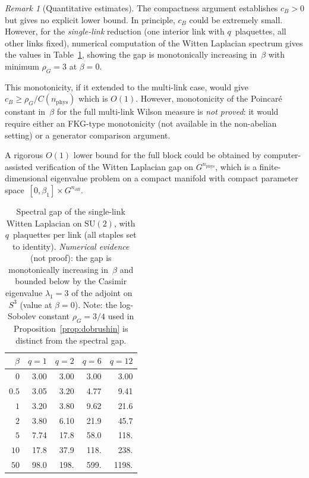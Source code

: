 \documentclass[11pt,a4paper]{article}
\theoremstyle{plain}
\theoremstyle{definition}
\theoremstyle{remark}
\newtheorem{remark}[theorem]{Remark}
\newcommand{\SU}{\mathrm{SU}}
\begin{document}
\begin{remark}[Quantitative estimates]
\label{rem:quantitative}
The compactness argument establishes $c_B > 0$ but gives
no explicit lower bound.  In principle, $c_B$ could be
extremely small.  However, for the \emph{single-link}
reduction (one interior link with $q$~plaquettes, all
other links fixed), numerical computation of the Witten
Laplacian spectrum gives the values in Table~\ref{tab:monotone},
showing the gap is monotonically increasing in~$\beta$
with minimum $\rho_G = 3$ at $\beta = 0$.

This monotonicity, if it extended to the multi-link case,
would give $c_B \geq \rho_G / C(n_{\mathrm{phys}})$
which is $O(1)$.  However, monotonicity of the Poincar\'e
constant in~$\beta$ for the full multi-link Wilson measure
is \emph{not proved}: it would require either an FKG-type
monotonicity (not available in the non-abelian setting)
or a generator comparison argument.

A rigorous $O(1)$ lower bound for the full block could be
obtained by computer-assisted verification of the Witten
Laplacian gap on $G^{n_{\mathrm{phys}}}$, which is a
finite-dimensional eigenvalue problem on a compact manifold
with compact parameter space~$[0, \beta_1] \times
G^{n_{\partial B}}$.
\end{remark}

\begin{table}[t]
\caption{Spectral gap of the single-link Witten Laplacian on
$\SU(2)$, with $q$~plaquettes per link (all staples set to
identity).  \emph{Numerical evidence} (not proof):
the gap is monotonically increasing in~$\beta$
and bounded below by the Casimir eigenvalue $\lambda_1 = 3$
of the adjoint on~$S^3$ (value at $\beta = 0$).
Note: the log-Sobolev constant $\rho_G = 3/4$
used in Proposition~\ref{prop:dobrushin} is distinct
from the spectral gap.}
\label{tab:monotone}
\centering
\begin{tabular}{@{}r|rrrr@{}}
\toprule
$\beta$ & $q = 1$ & $q = 2$ & $q = 6$ & $q = 12$ \\ \midrule
$0$ & 3.00 & 3.00 & 3.00 & 3.00 \\
$0.5$ & 3.05 & 3.20 & 4.77 & 9.41 \\
$1$ & 3.20 & 3.80 & 9.62 & 21.6 \\
$2$ & 3.80 & 6.10 & 21.9 & 45.7 \\
$5$ & 7.74 & 17.8 & 58.0 & 118. \\
$10$ & 17.8 & 37.9 & 118. & 238. \\
$50$ & 98.0 & 198. & 599. & 1198. \\
\bottomrule
\end{tabular}
\end{table}
\end{document}
